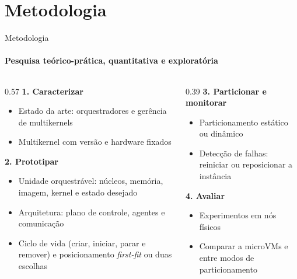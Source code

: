 \documentclass[aspectratio=169]{beamer}
\begin{document}
{%
        \section{Metodologia}

        \begin{frame}{Metodologia}
            \framesubtitle{Pesquisa teórico-prática, quantitativa e exploratória}
            \begin{columns}[T,onlytextwidth]
                \begin{column}{0.57\textwidth}
                    \setlength{\leftmargini}{1em}%
                    \textbf{1. Caracterizar}
                    \begin{itemize}
                        \item Estado da arte: orquestradores e gerência de multikernels
                        \item Multikernel com versão e hardware fixados
                    \end{itemize}
                    \vspace{1mm}
                    \textbf{2. Prototipar}
                    \begin{itemize}
                        \item Unidade orquestrável: núcleos, memória, imagem, kernel e estado desejado
                        \item Arquitetura: plano de controle, agentes e comunicação
                        \item Ciclo de vida (criar, iniciar, parar e remover) e posicionamento \textit{first-fit} ou duas escolhas
                    \end{itemize}
                \end{column}
                \begin{column}{0.39\textwidth}
                    \setlength{\leftmargini}{1em}%
                    \textbf{3. Particionar e monitorar}
                    \begin{itemize}
                        \item Particionamento estático ou dinâmico
                        \item Detecção de falhas: reiniciar ou reposicionar a instância
                    \end{itemize}
                    \vspace{1mm}
                    \textbf{4. Avaliar}
                    \begin{itemize}
                        \item Experimentos em nós físicos
                        \item Comparar a microVMs e entre modos de particionamento
                    \end{itemize}
                \end{column}
            \end{columns}
        \end{frame}

}
\end{document}

